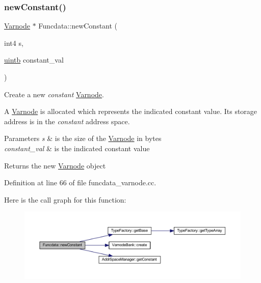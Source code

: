 \subsubsection{\texorpdfstring{newConstant()}{newConstant()}}
{\footnotesize\ttfamily \mbox{\hyperlink{class_varnode}{Varnode}} $\ast$ Funcdata\+::new\+Constant (\begin{DoxyParamCaption}\item[{int4}]{s,  }\item[{\mbox{\hyperlink{types_8h_a2db313c5d32a12b01d26ac9b3bca178f}{uintb}}}]{constant\+\_\+val }\end{DoxyParamCaption})}



Create a new {\itshape constant} \mbox{\hyperlink{class_varnode}{Varnode}}. 

A \mbox{\hyperlink{class_varnode}{Varnode}} is allocated which represents the indicated constant value. Its storage address is in the {\itshape constant} address space. 
\begin{DoxyParams}{Parameters}
{\em s} & is the size of the \mbox{\hyperlink{class_varnode}{Varnode}} in bytes \\
\hline
{\em constant\+\_\+val} & is the indicated constant value \\
\hline
\end{DoxyParams}
\begin{DoxyReturn}{Returns}
the new \mbox{\hyperlink{class_varnode}{Varnode}} object 
\end{DoxyReturn}


Definition at line 66 of file funcdata\+\_\+varnode.\+cc.

Here is the call graph for this function\+:
\nopagebreak
\begin{figure}[H]
\begin{center}
\leavevmode
\includegraphics[width=350pt]{class_funcdata_af58542dbcc89f4b84ffc8834b023125b_cgraph}
\end{center}
\end{figure}
\mbox{\label{class_funcdata_add1098b768d9a176cf59e4f4c9e27cb5}} 

